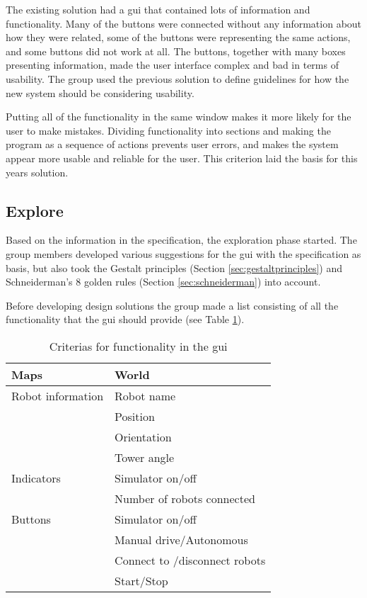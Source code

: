 The existing solution had a \acrshort{gui} that contained lots of information and functionality. Many of the buttons were connected without any information about how they were related, some of the buttons were representing the same actions, and some buttons did not work at all. The buttons, together with many boxes presenting information, made the user interface complex and bad in terms of usability. The group used the previous solution to define guidelines for how the new system should be considering usability.

Putting all of the functionality in the same window makes it more likely for the user to make mistakes. Dividing functionality into sections and making the program as a sequence of actions prevents user errors, and makes the system appear more usable and reliable for the user. This criterion laid the basis for this years solution. 

\subsection{Explore}
\label{sec:explore}
Based on the information in the specification, the exploration phase started. The group members developed various suggestions for the \acrshort{gui} with the specification as basis, but also took the Gestalt principles (Section \ref{sec:gestaltprinciples}) and Schneiderman's 8 golden rules (Section \ref{sec:schneiderman}) into account.

Before developing design solutions the group made a list consisting of all the functionality that the \acrshort{gui} should provide (see Table \ref{tab:guicriterias}).
\begin{table}[ht]
\begin{center}
 \begin{tabular}{|l l|} 
 \hline
 Maps               &   World \\
 \hline
 Robot information  &   Robot name \\
                    &   Position \\
                    &   Orientation \\
                    &   Tower angle \\
 \hline
 Indicators         &   Simulator on/off \\
                    &   Number of robots connected \\
 \hline
 Buttons            &   Simulator on/off \\
                    &   Manual drive/Autonomous \\
                    &   Connect to /disconnect robots \\
                    &   Start/Stop \\

\hline
\end{tabular}
\end{center}
\caption{Criterias for functionality in the \acrshort{gui}}
\label{tab:guicriterias}
\end{table}


